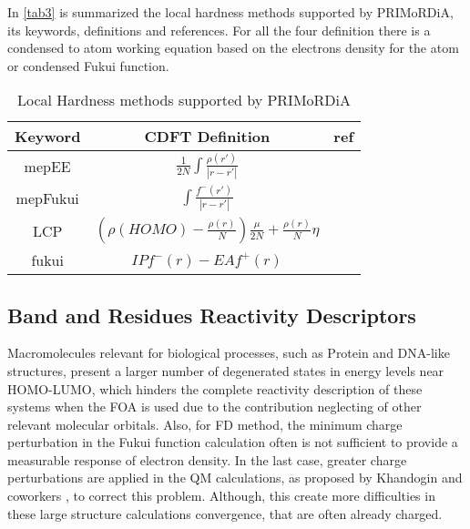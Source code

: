 \documentclass[a4paper,11pt]{refart}
\begin{document}
In \autoref{tab3} is summarized the local hardness methods supported by PRIMoRDiA, its keywords, definitions and references. For all the four definition there is a condensed to atom working equation based on the electrons density for the atom or condensed Fukui function. 
 
\hspace*{-\leftmarginwidth}
\begin{minipage}{\fullwidth}
	\begin{table}[H]
		\centering	
		\caption{Local Hardness methods supported by PRIMoRDiA}
		\begin{tabular}{c|c|c}
			\toprule
			Keyword & CDFT Definition & ref \\
			\midrule
			mepEE & $ \frac{1}{2N} \int \frac{\rho(r')}{|r - r'|}$   &    \cite{berkowitz1985concept} \\ \hline	
			mepFukui & $ \int \frac{f^{-}(r')}{|r - r'|}$  & \cite{cardenas2011fukui} \\ \hline	
			LCP & $\left (\rho(HOMO) - \frac{\rho(r)}{N} \right) \frac{\mu}{2N} + \frac{\rho(r)}{N}\eta$ & \cite{gal2011new} \\ \hline			
			fukui &$IP f^-(r) - EA f^+(r)$  & \cite{meneses2004proposal} \\
			\bottomrule
		\end{tabular} 
		\label{tab3}	
	\end{table}	
\end{minipage}

\subsection{Band and Residues Reactivity Descriptors}

Macromolecules relevant for biological processes, such as Protein and DNA-like structures, present a larger number of degenerated states in energy levels near HOMO-LUMO, which hinders the complete reactivity description of these systems when the FOA is used due to the contribution neglecting of other relevant molecular orbitals\cite{Fukushima2008}. Also, for FD method, the minimum charge perturbation in the Fukui function calculation often is not sufficient to provide a measurable response of electron density. In the last case, greater charge perturbations are applied in the QM calculations, as proposed by Khandogin and coworkers \cite{khandogin2003insights}, to correct this problem. Although, this create more difficulties in these large structure calculations convergence, that are often already charged.   
 
\end{document}
